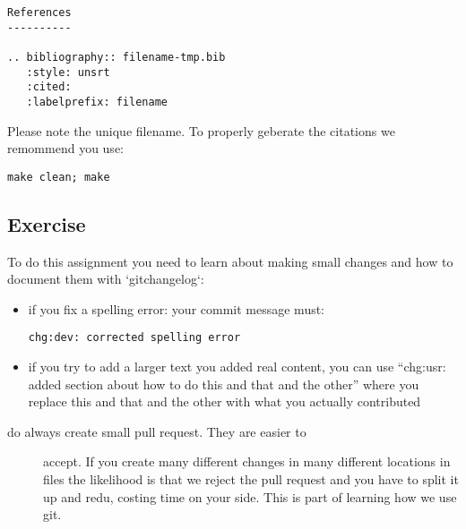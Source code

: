 \begin{verbatim}
References
----------

.. bibliography:: filename-tmp.bib
   :style: unsrt
   :cited:
   :labelprefix: filename
\end{verbatim}

Please note the unique filename. To properly geberate the citations we
remommend you use:

\begin{verbatim}
make clean; make
\end{verbatim}

\subsection{Exercise}\label{exercise}

To do this assignment you need to learn about making small changes and
how to document them with `gitchangelog`:

\begin{itemize}
\item
  if you fix a spelling error: your commit message must:

\begin{verbatim}
chg:dev: corrected spelling error
\end{verbatim}
\item
  if you try to add a larger text you added real content, you can use
  ``chg:usr: added section about how to do this and that and the other''
  where you replace this and that and the other with what you actually
  contributed
\end{itemize}

\begin{description}
\item[do always create small pull request. They are easier to]
accept. If you create many different changes in many different locations
in files the likelihood is that we reject the pull request and you have
to split it up and redu, costing time on your side. This is part of
learning how we use git.
\end{description}

